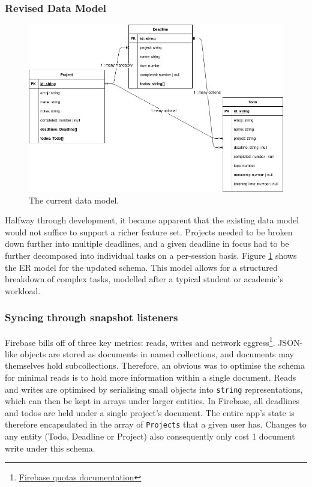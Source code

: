 \subsubsection{Revised Data Model}
\begin{figure}[h]
    \begin{center}
        \includegraphics[scale=0.5]{images/final_data_model.png}
    \end{center}
    \caption{The current data model.}
    \label{fig:app_current_data_model}
\end{figure}

Halfway through development, it became apparent that the existing data model would not suffice to support a richer feature set. Projects needed to be broken down further into multiple deadlines, and a given deadline in focus had to be further decomposed into individual tasks on a per-session basis. Figure \ref{fig:app_current_data_model} shows the ER model for the updated schema. This model allows for a structured breakdown of complex tasks, modelled after a typical student or academic's workload.

\subsubsection{Syncing through snapshot listeners}
Firebase bills off of three key metrics: reads, writes and network eggress\footnote{\href{https://cloud.google.com/firestore/quotas}{Firebase quotas documentation}}. JSON-like objects are stored as documents in named collections, and documents may themselves hold subcollections. Therefore, an obvious was to optimise the schema for minimal reads is to hold more information within a single document. Reads and writes are optimised by serialising small objects into \texttt{string} representations, which can then be kept in arrays under larger entities. In Firebase, all deadlines and todos are held under a single project's document. The entire app's state is therefore encapsulated in the array of \texttt{Projects} that a given user has. Changes to any entity (Todo, Deadline or Project) also consequently only cost 1 document write under this schema.

